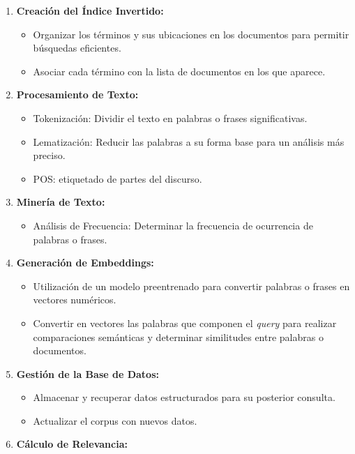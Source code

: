 \documentclass[
  12pt,
  openany]{book}
\providecommand{\tightlist}{%
  \setlength{\itemsep}{0pt}\setlength{\parskip}{0pt}}
\begin{document}
\begin{enumerate}
\def\labelenumi{\arabic{enumi}.}
\item
  \textbf{Creación del Índice Invertido:}

  \begin{itemize}
  \item
    Organizar los términos y sus ubicaciones en los documentos para permitir búsquedas eficientes.
  \item
    Asociar cada término con la lista de documentos en los que aparece.
  \end{itemize}
\item
  \textbf{Procesamiento de Texto:}

  \begin{itemize}
  \item
    Tokenización: Dividir el texto en palabras o frases significativas.
  \item
    Lematización: Reducir las palabras a su forma base para un análisis más preciso.
  \item
    POS: etiquetado de partes del discurso.
  \end{itemize}
\item
  \textbf{Minería de Texto:}

  \begin{itemize}
  \tightlist
  \item
    Análisis de Frecuencia: Determinar la frecuencia de ocurrencia de palabras o frases.
  \end{itemize}
\item
  \textbf{Generación de Embeddings:}

  \begin{itemize}
  \item
    Utilización de un modelo preentrenado para convertir palabras o frases en vectores numéricos.
  \item
    Convertir en vectores las palabras que componen el \emph{query} para realizar comparaciones semánticas y determinar similitudes entre palabras o documentos.
  \end{itemize}
\item
  \textbf{Gestión de la Base de Datos:}

  \begin{itemize}
  \item
    Almacenar y recuperar datos estructurados para su posterior consulta.
  \item
    Actualizar el corpus con nuevos datos.
  \end{itemize}
\item
  \textbf{Cálculo de Relevancia:}


\end{enumerate}
\end{document}
